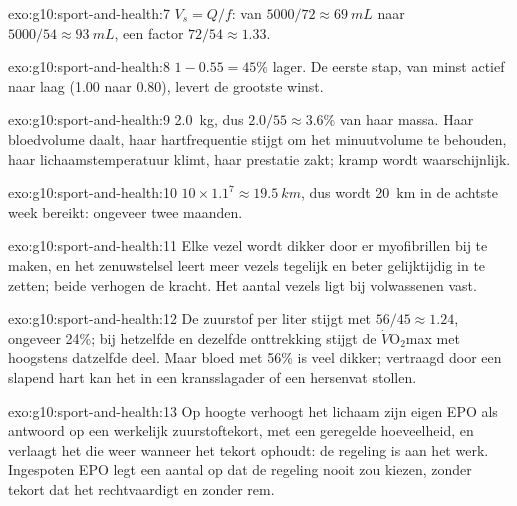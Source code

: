 \begin{solution}{exo:g10:sport-and-health:7}
$V_s = Q/f$: van $5000/72 \approx \qty{69}{mL}$ naar $5000/54 \approx
\qty{93}{mL}$, een factor $72/54 \approx 1.33$.
\end{solution}

\begin{solution}{exo:g10:sport-and-health:8}
$1 - 0.55 = 45\%$ lager. De eerste stap, van minst actief naar laag
(1.00 naar 0.80), levert de grootste winst.
\end{solution}

\begin{solution}{exo:g10:sport-and-health:9}
\qty{2.0}{kg}, dus $2.0/55 \approx 3.6\%$ van haar massa. Haar
bloedvolume daalt, haar hartfrequentie stijgt om het minuutvolume te
behouden, haar lichaamstemperatuur klimt, haar prestatie zakt; kramp
wordt waarschijnlijk.
\end{solution}

\begin{solution}{exo:g10:sport-and-health:10}
$10 \times 1.1^7 \approx \qty{19.5}{km}$, dus wordt \qty{20}{km} in de
achtste week bereikt: ongeveer twee maanden.
\end{solution}

\begin{solution}{exo:g10:sport-and-health:11}
Elke vezel wordt dikker door er myofibrillen bij te maken, en het
zenuwstelsel leert meer vezels tegelijk en beter gelijktijdig in te
zetten; beide verhogen de kracht. Het aantal vezels ligt bij volwassenen
vast.
\end{solution}

\begin{solution}{exo:g10:sport-and-health:12}
De zuurstof per liter stijgt met $56/45 \approx 1.24$, ongeveer 24\%; bij
hetzelfde  en dezelfde onttrekking stijgt de
$\dot V\!\mathrm{O_2}$max met hoogstens datzelfde deel. Maar bloed met
56\%  is veel dikker; vertraagd door een slapend hart kan het in
een kransslagader of een hersenvat stollen.
\end{solution}

\begin{solution}{exo:g10:sport-and-health:13}
Op hoogte verhoogt het lichaam zijn eigen EPO als antwoord op een
werkelijk zuurstoftekort, met een geregelde hoeveelheid, en verlaagt het
die weer wanneer het tekort ophoudt: de regeling is aan het werk.
Ingespoten EPO legt een aantal op dat de regeling nooit zou kiezen,
zonder tekort dat het rechtvaardigt en zonder rem.
\end{solution}

